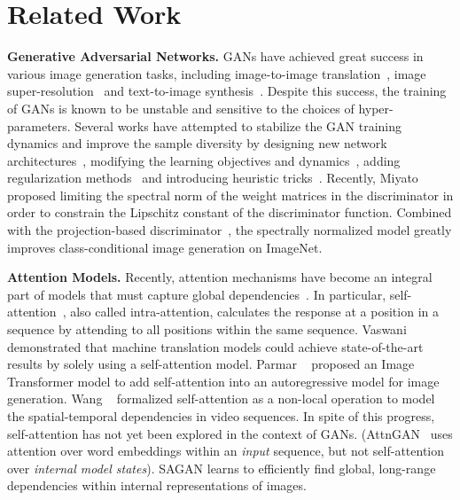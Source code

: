 \documentclass{article}
\begin{document}
\section{Related Work}\label{sec:sagan_relate}

\vspace{+10pt}
\textbf{Generative Adversarial Networks.} GANs have achieved great success in various image generation tasks, including image-to-image translation~\cite{pix2pix2017,cyclegan2017,Taigmaniclr17,LiuT16,Xue17segan,Taesung2019}, image super-resolution~\cite{Christian2016,Casper2016} and text-to-image synthesis~\cite{reed2016generative,reed2016learning,Han17, HongYCL18}.  Despite this success, the training of GANs is known to be unstable and sensitive to the choices of hyper-parameters.
Several works have attempted to stabilize the GAN training dynamics and improve the sample diversity by designing new network architectures~\cite{Radford15,Han17, KarrasALL18, Karras2019}, modifying the learning objectives and dynamics~\cite{Martin17WGAN,Salimans18,MetzICLR17, CheLJBL16, Zhao2016,Alexia2019}, adding regularization methods~\cite{GulrajaniAADC17,Miyato18a} and introducing heuristic tricks~\cite{Salimans2016, Odena2016, DRS}.
Recently, Miyato \etal~\cite{Miyato18a} proposed limiting the spectral norm of the weight matrices in the discriminator in order to constrain the Lipschitz constant of the discriminator function.
Combined with the projection-based discriminator~\cite{Miyato18b}, the spectrally normalized model greatly improves class-conditional image generation on ImageNet.


\vspace{+10pt}
\textbf{Attention Models.} Recently, attention mechanisms have become an integral part of models that must capture global dependencies~\cite{Dzmitry14,XuBKCCSZB15,YangHGDS16,GregorDGRW15, ChenMRA18}. 
In particular, self-attention~\cite{Cheng16, ParikhT0U16}, also called intra-attention, calculates the response at a position in a sequence by attending to all positions within the same sequence. 
Vaswani \etal~\cite{Ashish17} demonstrated that machine translation models could achieve state-of-the-art results by solely using a self-attention model. 
Parmar \etal~\cite{Parmar18} proposed an Image Transformer model to add self-attention into an autoregressive model for image generation. 
Wang \etal~\cite{Wang18} formalized self-attention as a non-local operation to model the spatial-temporal dependencies in video sequences. 
In spite of this progress, self-attention has not yet been explored in the context of GANs. 
(AttnGAN~\cite{Xu18} uses attention over word embeddings within an {\em input} sequence, but not self-attention over {\em internal model states}). 
SAGAN learns to efficiently find global, long-range dependencies within internal representations of images.  
\end{document}
